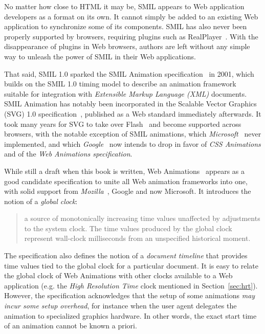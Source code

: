 \documentclass[graybox]{svmult}
\begin{document}
No matter how close to HTML it may be, SMIL appears to Web application
developers as a format on its own. It cannot simply be added to an existing
Web application to synchronize some of its components. SMIL has also never
been properly supported by browsers, requiring plugins such as
RealPlayer~\cite{realplayer}. With the disappearance of plugins in Web
browsers, authors are left without any simple way to unleash the power of SMIL
in their Web applications.

That said, SMIL 1.0 sparked the SMIL Animation
specification~\cite{smilanimation} in 2001, which builds on the SMIL 1.0
timing model to describe an animation framework suitable for integration with
\emph{Extensible Markup Language (XML)} documents. SMIL Animation has notably been incorporated in the Scalable
Vector Graphics (SVG) 1.0 specification~\cite{svg}, published as a Web
standard immediately afterwards. It took many years for SVG to take over
Flash~\cite{flash} and become supported across browsers, with the notable
exception of SMIL animations, which \emph{Microsoft}~\cite{microsoft} never
implemented, and which \emph{Google}~\cite{google} now intends to drop in
favor of \emph{CSS Animations} and of the \emph{Web Animations specification}.

While still a draft when this book is written, Web Animations~\cite{webanimation} appears as
a good candidate specification to unite all Web animation frameworks into one,
with solid support from \emph{Mozilla}~\cite{mozilla}, Google and now Microsoft. It introduces the
notion of a \emph{global clock}:
\begin{quote} a source of monotonically increasing time values unaffected by
adjustments to the system clock. The time values produced by the global clock
represent wall-clock milliseconds from an unspecified historical moment.
\end{quote}
The specification also defines the notion of a \emph{document timeline}
that provides time values tied to the global clock for a particular document.
It is easy to relate the global clock of Web Animations with other clocks
available to a Web application (e.g. the \emph{High Resolution Time} clock mentioned
in Section~\ref{sec:hrt}). However, the specification acknowledges that the setup of some
animations \emph{may incur some setup overhead}, for instance when the user agent
delegates the animation to specialized graphics hardware. In other words, the
exact start time of an animation cannot be known a priori.
\end{document}
